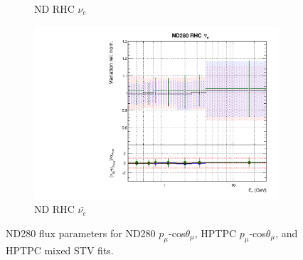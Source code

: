\begin{figure}
\begin{subfigure}{0.45\textwidth}
  \caption{ND RHC $\nu_{e}$}
\end{subfigure}
\begin{subfigure}{0.45\textwidth}
  \centering
  \includegraphics[width=0.75\linewidth]{figs/hptpcfitsflux_7}
  \caption{ND RHC $\bar{\nu_e}$}
\end{subfigure}
\caption{ND280 flux parameters for ND280 $p_{\mu}$-cos$\theta_{\mu}$, HPTPC $p_{\mu}$-cos$\theta_{\mu}$, and HPTPC mixed STV fits.}
\label{fig:hptpcfluxND}
\end{figure}

